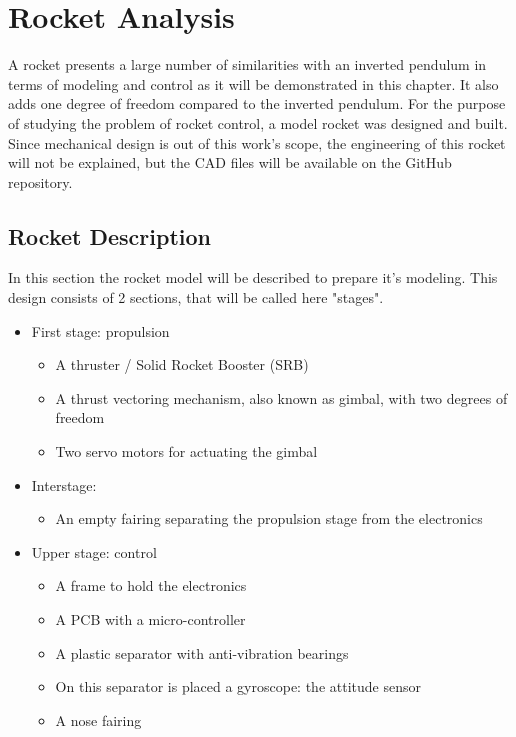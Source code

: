\chapter{Rocket Analysis}
		A rocket presents a large number of similarities with an inverted pendulum in terms of modeling and control as it will be demonstrated in this chapter. It also adds one degree of freedom compared to the inverted pendulum.
		For the purpose of studying the problem of rocket control, a model rocket was designed and built. Since mechanical design is out of this work's scope, the engineering of this rocket will not be explained, but the CAD files will be available on the GitHub repository.
		
		
		\section{Rocket Description}
			In this section the rocket model will be described to prepare it's modeling.
			This design consists of 2 sections, that will be called here "stages".
			\begin{itemize}
				\item First stage: propulsion
				\begin{itemize}
					\item {A thruster / Solid Rocket Booster (SRB)}
					\item {A thrust vectoring mechanism, also known as gimbal, with two degrees of freedom}
					\item {Two servo motors for actuating the gimbal}
				\end{itemize}
				\item Interstage:
				\begin{itemize}
					\item {An empty fairing separating the propulsion stage from the electronics}
				\end{itemize}
				\item Upper stage: control
				\begin{itemize}
					\item {A frame to hold the electronics}
					\item {A PCB with a micro-controller}
					\item {A plastic separator with anti-vibration bearings}
					\item {On this separator is placed a gyroscope: the attitude sensor}
					\item A nose fairing
				\end{itemize}
			\end{itemize}
			
